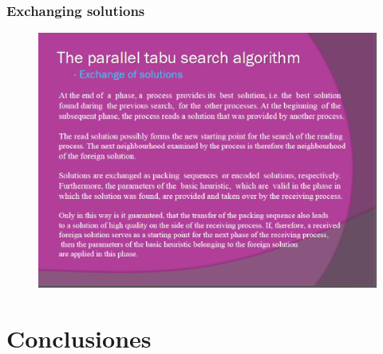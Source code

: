 \documentclass{beamer}
\begin{document}
\begin{frame}
\frametitle{Exchanging solutions }
\begin{figure}[!th]
\begin{center}
\includegraphics[width=1\textwidth]{img/picn13.eps}
\end{center}
\end{figure}
\end{frame}
\section{Conclusiones}

\end{document}
